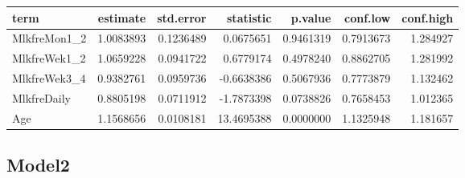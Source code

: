 \documentclass[]{article}
\newenvironment{Shaded}{\begin{snugshade}}{\end{snugshade}}
\newcommand{\DataTypeTok}[1]{\textcolor[rgb]{0.13,0.29,0.53}{#1}}
\newcommand{\KeywordTok}[1]{\textcolor[rgb]{0.13,0.29,0.53}{\textbf{#1}}}
\newcommand{\NormalTok}[1]{#1}
\newcommand{\OperatorTok}[1]{\textcolor[rgb]{0.81,0.36,0.00}{\textbf{#1}}}
\newcommand{\OtherTok}[1]{\textcolor[rgb]{0.56,0.35,0.01}{#1}}
\newcommand{\StringTok}[1]{\textcolor[rgb]{0.31,0.60,0.02}{#1}}
\begin{document}
\begin{longtable}[]{@{}lrrrrrr@{}}
\toprule
term & estimate & std.error & statistic & p.value & conf.low &
conf.high\tabularnewline
\midrule
\endhead
MlkfreMon1\_2 & 1.0083893 & 0.1236489 & 0.0675651 & 0.9461319 &
0.7913673 & 1.284927\tabularnewline
MlkfreWek1\_2 & 1.0659228 & 0.0941722 & 0.6779174 & 0.4978240 &
0.8862705 & 1.281992\tabularnewline
MlkfreWek3\_4 & 0.9382761 & 0.0959736 & -0.6638386 & 0.5067936 &
0.7773879 & 1.132462\tabularnewline
MlkfreDaily & 0.8805198 & 0.0711912 & -1.7873398 & 0.0738826 & 0.7658453
& 1.012365\tabularnewline
Age & 1.1568656 & 0.0108181 & 13.4695388 & 0.0000000 & 1.1325948 &
1.181657\tabularnewline
\bottomrule
\end{longtable}

\hypertarget{model2-1}{%
\subsection{Model2}\label{model2-1}}

\begin{Shaded}
\end{Shaded}
\end{document}
